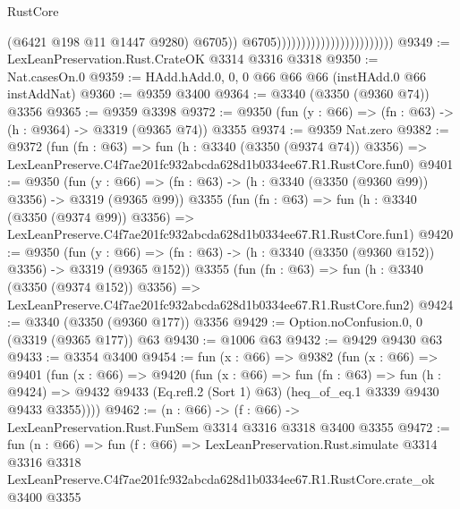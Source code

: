 \begin{lexlean}{RustCore}
\begin{coremodule}
                                                        (@6421 @198 @11 @1447 @9280)
                                                        @6705))
                                                    @6705))))))))))))))))))))))))
@9349 := LexLeanPreservation.Rust.CrateOK @3314 @3316 @3318
@9350 := Nat.casesOn.{0}
@9359 := HAdd.hAdd.{0, 0, 0} @66 @66 @66 (instHAdd.{0} @66 instAddNat)
@9360 := @9359 @3400
@9364 := @3340 (@3350 (@9360 @74)) @3356
@9365 := @9359 @3398
@9372 := @9350 (fun (y : @66) => (fn : @63) -> (h : @9364) -> @3319 (@9365 @74)) @3355
@9374 := @9359 Nat.zero
@9382 := @9372
    (fun (fn : @63) =>
    fun (h : @3340 (@3350 (@9374 @74)) @3356) =>
    LexLeanPreserve.C4f7ae201fc932abcda628d1b0334ee67.R1.RustCore.fun0)
@9401 := @9350
    (fun (y : @66) => (fn : @63) -> (h : @3340 (@3350 (@9360 @99)) @3356) -> @3319 (@9365 @99))
    @3355
    (fun (fn : @63) =>
    fun (h : @3340 (@3350 (@9374 @99)) @3356) =>
    LexLeanPreserve.C4f7ae201fc932abcda628d1b0334ee67.R1.RustCore.fun1)
@9420 := @9350
    (fun (y : @66) => (fn : @63) -> (h : @3340 (@3350 (@9360 @152)) @3356) -> @3319 (@9365 @152))
    @3355
    (fun (fn : @63) =>
    fun (h : @3340 (@3350 (@9374 @152)) @3356) =>
    LexLeanPreserve.C4f7ae201fc932abcda628d1b0334ee67.R1.RustCore.fun2)
@9424 := @3340 (@3350 (@9360 @177)) @3356
@9429 := Option.noConfusion.{0, 0} (@3319 (@9365 @177)) @63
@9430 := @1006 @63
@9432 := @9429 @9430 @63
@9433 := @3354 @3400
@9454 := fun (x : @66) =>
  @9382
    (fun (x : @66) =>
    @9401
      (fun (x : @66) =>
      @9420
        (fun (x : @66) =>
        fun (fn : @63) =>
        fun (h : @9424) =>
        @9432 @9433 (Eq.refl.{2} (Sort 1) @63) (heq_of_eq.{1} @3339 @9430 @9433 @3355))))
@9462 := (n : @66) -> (f : @66) -> LexLeanPreservation.Rust.FunSem @3314 @3316 @3318 @3400 @3355
@9472 := fun (n : @66) =>
  fun (f : @66) =>
  LexLeanPreservation.Rust.simulate
    @3314
    @3316
    @3318
    LexLeanPreserve.C4f7ae201fc932abcda628d1b0334ee67.R1.RustCore.crate_ok
    @3400
    @3355
\end{coremodule}
\end{lexlean}
